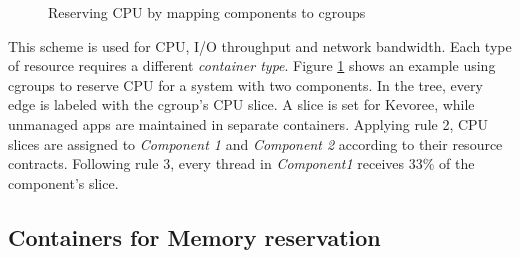 \begin{figure}
\centering

\caption{Reserving CPU by mapping components to cgroups} \label{fig:Mapping}
\vspace{-0.5cm}
\end{figure}

This scheme is used for CPU, I/O throughput and network bandwidth.
Each type of resource requires a different \textit{container type}.
Figure \ref{fig:Mapping} shows an example 
using cgroups to reserve CPU for a system with two components.
In the tree, every edge is labeled with the cgroup's CPU slice.
A slice is set for Kevoree, while unmanaged apps are maintained in separate containers.
Applying rule 2, CPU slices are assigned to \textit{Component 1} and \textit{Component 2} according to their resource contracts.
Following rule 3, every thread in \textit{Component1} receives $ 33\% $ of the component's slice.


\subsection{Containers for Memory reservation} \label{overview-memory-reservation}

